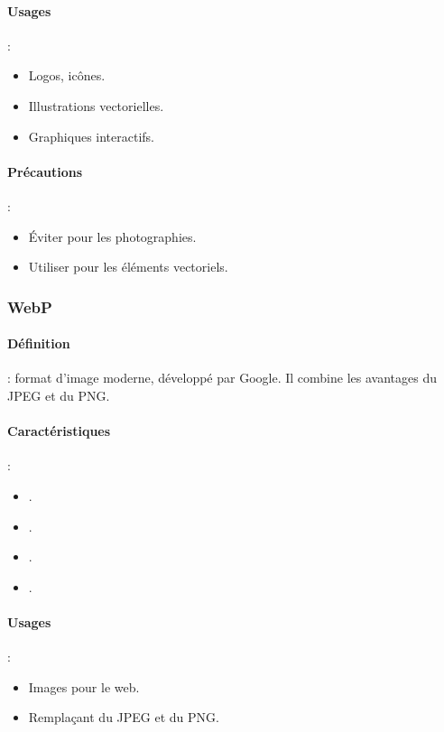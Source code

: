\paragraph{Usages} :
\begin{itemize}
    \item Logos, icônes.
    \item Illustrations vectorielles.
    \item Graphiques interactifs.
\end{itemize}

\paragraph{Précautions} :
\begin{itemize}
    \item Éviter pour les photographies.
    \item Utiliser pour les éléments vectoriels.
\end{itemize}

\subsubsection{WebP}

\paragraph{Définition} : format d'image moderne, développé par Google. Il combine les avantages du JPEG et du PNG.

\paragraph{Caractéristiques} :
\begin{itemize}
    \item {}.
    \item {}.
    \item {}.
    \item {}.
\end{itemize}

\paragraph{Usages} :
\begin{itemize}
    \item Images pour le web.
    \item Remplaçant du JPEG et du PNG.
\end{itemize}

